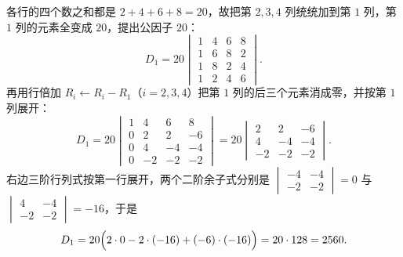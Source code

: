 
\begin{solution}
各行的四个数之和都是 $2+4+6+8=20$，故把第 $2,3,4$ 列统统加到第 $1$ 列，第 $1$ 列的元素全变成 $20$，提出公因子 $20$：
\[
D_1=20\begin{vmatrix}1&4&6&8\\1&6&8&2\\1&8&2&4\\1&2&4&6\end{vmatrix}.
\]
再用行倍加 $R_i\leftarrow R_i-R_1$（$i=2,3,4$）把第 $1$ 列的后三个元素消成零，并按第 $1$ 列展开：
\[
D_1=20\begin{vmatrix}1&4&6&8\\0&2&2&-6\\0&4&-4&-4\\0&-2&-2&-2\end{vmatrix}
=20\begin{vmatrix}2&2&-6\\4&-4&-4\\-2&-2&-2\end{vmatrix}.
\]
右边三阶行列式按第一行展开，两个二阶余子式分别是
$\begin{vmatrix}-4&-4\\-2&-2\end{vmatrix}=0$ 与 $\begin{vmatrix}4&-4\\-2&-2\end{vmatrix}=-16$，于是
\[
D_1=20\Bigl(2\cdot0-2\cdot(-16)+(-6)\cdot(-16)\Bigr)=20\cdot128=2560 .
\]
\end{solution}


